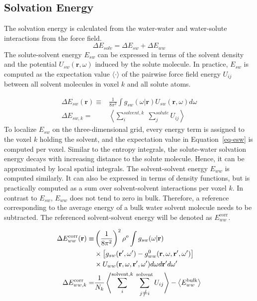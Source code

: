\documentclass[9pt,tutorial]{livecoms}
\renewcommand{\neq}{\setbox0\hbox{=}\rlap{\hbox to \wd0{\hss /\hss}}\box0}
\begin{document}
\subsection{Solvation Energy}
The solvation energy is calculated from the water-water and water-solute interactions from the force field.
\begin{equation}
	\Delta E_\textit{solv} = \Delta E_\textit{sw} + \Delta E_\textit{ww}
\end{equation}
The solute-solvent energy $E_{sw}$ can be expressed in terms of the solvent density and the potential $U_{sw}(\textbf{r},\omega)$ induced by the solute molecule.
In practice, $E_{sw}$ is computed as the expectation value $\langle\cdot\rangle$ of the pairwise force field energy $U_{ij}$ between all solvent molecules in voxel $k$ and all solute atoms.

\begin{equation}
	\begin{aligned}
		\label{eq-esw}
		\Delta E_{sw}(\textbf{r}) \equiv& \frac{1}{8\pi^2} \int g_\textit{sw}\left(\omega|\textbf{r}\right) U_\textit{sw}\left(\textbf{r}, \omega\right) d\omega \\
		\Delta E_{sw,k}=& \left\langle \sum_i^{\textit{solvent},k} \; \sum_j^\textit{solute} U_{ij}\right\rangle
	\end{aligned}
\end{equation}
To localize $E_{sw}$ on the three-dimensional grid, every energy term is assigned to the voxel $k$ holding the solvent, and the expectation value in Equation~\ref{eq-esw} is computed per voxel.
Similar to the entropy integrals, the solute-water solvation energy decays with increasing distance to the solute molecule.
Hence, it can be approximated by local spatial integrals. 
The solvent-solvent energy $E_{ww}$ is computed similarly.
It can also be expressed in terms of density functions, but is practically computed as a sum over solvent-solvent interactions per voxel $k$.
In contrast to $E_{sw}$, $E_{ww}$ does not tend to zero in bulk.
Therefore, a reference corresponding to the average energy of a bulk water solvent molecule needs to be subtracted.
The referenced solvent-solvent energy will be denoted as $E_{ww}^\text{corr}$.

\begin{equation}
	\begin{aligned}
		\Delta E_{ww}^\text{corr}(\textbf{r}) \equiv & \left(\frac{1}{8\pi^2} \right)^2 \rho^o \int g_{sw}(\omega|\textbf{r}) \\
			& \times \left[g_{sw}(\textbf{r}^\prime , \omega^\prime) - g^0_{ww} (\textbf{r}, \omega, \textbf{r}^\prime, \omega^\prime )\right] \\
			& \times U_{ww}(\textbf{r}, \omega, \textbf{r}^\prime, \omega^\prime)d\omega d\textbf{r}^\prime d\omega^\prime \\
		\Delta E_{ww,k}^\text{corr} =& \frac{1}{N_k} \left\langle \sum_i^{\text{solvent},k} \; \sum_{j \neq i}^\text{solvent} U_{ij}\right\rangle - \left\langle E_{ww}^\text{bulk}\right\rangle
	\end{aligned}
\end{equation}
\end{document}
